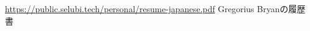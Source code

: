 \documentclass[11pt, a4paper]{selu-cv}
\begin{document}
\makecvheader[C]

\makecvfooter
  {\url{https://public.selubi.tech/personal/resume-japanese.pdf}}
  {}
  {Gregorius Bryanの履歴書}










\end{document}
